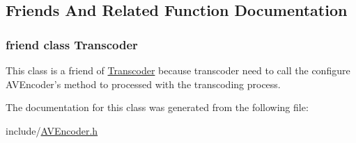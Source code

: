 \subsection{Friends And Related Function Documentation}
\hypertarget{classbr_1_1ufscar_1_1lince_1_1xpta_1_1streaming_1_1AVEncoder_af9f366fbe5cbc06f38791f120c62c182}{
\subsubsection[{Transcoder}]{\setlength{\rightskip}{0pt plus 5cm}friend class {\bf Transcoder}}}
\label{classbr_1_1ufscar_1_1lince_1_1xpta_1_1streaming_1_1AVEncoder_af9f366fbe5cbc06f38791f120c62c182}


This class is a friend of \hyperlink{classbr_1_1ufscar_1_1lince_1_1xpta_1_1streaming_1_1Transcoder}{Transcoder} because transcoder need to call the configure AVEncoder's method to processed with the transcoding process. 



The documentation for this class was generated from the following file:\begin{DoxyCompactItemize}
\item 
include/\hyperlink{AVEncoder_8h}{AVEncoder.h}\end{DoxyCompactItemize}
